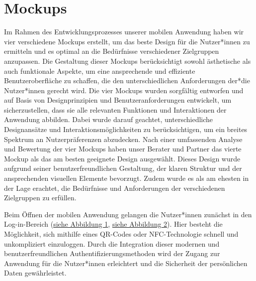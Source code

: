 \section{Mockups}
Im Rahmen des Entwicklungsprozesses unserer mobilen Anwendung haben wir vier verschiedene Mockups erstellt, um das beste Design für die Nutzer*innen zu ermitteln und es optimal an die Bedürfnisse verschiedener Zielgruppen anzupassen. Die Gestaltung dieser Mockups berücksichtigt sowohl ästhetische als auch funktionale Aspekte, um eine ansprechende und effiziente Benutzeroberfläche zu schaffen, die den unterschiedlichen Anforderungen der*die Nutzer*innen gerecht wird.
\newline
\newline
Die vier Mockups wurden sorgfältig entworfen und auf Basis von Designprinzipien und Benutzeranforderungen entwickelt, um sicherzustellen, dass sie alle relevanten Funktionen und Interaktionen der Anwendung abbilden. Dabei wurde darauf geachtet, unterschiedliche Designansätze und Interaktionsmöglichkeiten zu berücksichtigen, um ein breites Spektrum an Nutzerpräferenzen abzudecken.
\newline
\newline
Nach einer umfassenden Analyse und Bewertung der vier Mockups haben unser Berater und Partner das vierte Mockup als das am besten geeignete Design ausgewählt. Dieses Design wurde aufgrund seiner benutzerfreundlichen Gestaltung, der klaren Struktur und der ansprechenden visuellen Elemente bevorzugt. Zudem wurde es als am ehesten in der Lage erachtet, die Bedürfnisse und Anforderungen der verschiedenen Zielgruppen zu erfüllen.

\newpage
Beim Öffnen der mobilen Anwendung gelangen die Nutzer*innen zunächst in den Log-in-Bereich (\hyperref[fig:log1]{siehe Abbildung 1}, \hyperref[fig:log2]{siehe Abbildung 2}). Hier besteht die Möglichkeit, sich mithilfe eines QR-Codes oder NFC-Technologie schnell und unkompliziert einzuloggen. Durch die Integration dieser modernen und benutzerfreundlichen Authentifizierungsmethoden wird der Zugang zur Anwendung für die Nutzer*innen erleichtert und die Sicherheit der persönlichen Daten gewährleistet.

